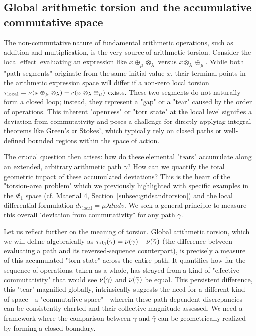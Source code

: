 \subsection{Global arithmetic torsion and the accumulative commutative space}
\label{sec:global_torsion_acs_narrative_enhanced}

The non-commutative nature of fundamental arithmetic operations, such as addition and multiplication, is the very source of arithmetic torsion. Consider the local effect: evaluating an expression like $x \oplus_\mu \otimes_\lambda$ versus $x \otimes_\lambda \oplus_\mu$. While both "path segments" originate from the same initial value $x$, their terminal points in the arithmetic expression space will differ if a non-zero local torsion $\tau_{\text{local}} = \nu(x \oplus_\mu \otimes_\lambda) - \nu(x \otimes_\lambda \oplus_\mu)$ exists. These two segments do not naturally form a closed loop; instead, they represent a "gap" or a "tear" caused by the order of operations. This inherent "openness" or "torn state" at the local level signifies a deviation from commutativity and poses a challenge for directly applying integral theorems like Green's or Stokes', which typically rely on closed paths or well-defined bounded regions within the space of action.

The crucial question then arises: how do these elemental "tears" accumulate along an extended, arbitrary arithmetic path $\gamma$? How can we quantify the total geometric impact of these accumulated deviations? This is the heart of the "torsion-area problem" which we previously highlighted with specific examples in the $\mathfrak{E}_1$ space (cf. Material 4, Section~\ref{subsec:gridsandtorsion}) and the local differential formulation $d\tau_{\text{local}} = \mu \lambda du dv$. We seek a general principle to measure this overall "deviation from commutativity" for any path $\gamma$.

Let us reflect further on the meaning of torsion. Global arithmetic torsion, which we will define algebraically as $\tau_{\text{alg}}(\gamma) = \nu(\gamma) - \nu(\bar{\gamma})$ (the difference between evaluating a path and its reversed-sequence counterpart), is precisely a measure of this accumulated "torn state" across the entire path. It quantifies how far the sequence of operations, taken as a whole, has strayed from a kind of "effective commutativity" that would see $\nu(\gamma)$ and $\nu(\bar{\gamma})$ be equal. This persistent difference, this "tear" magnified globally, intrinsically suggests the need for a different kind of space—a "commutative space"—wherein these path-dependent discrepancies can be consistently charted and their collective magnitude assessed. We need a framework where the comparison between $\gamma$ and $\bar{\gamma}$ can be geometrically realized by forming a closed boundary.

